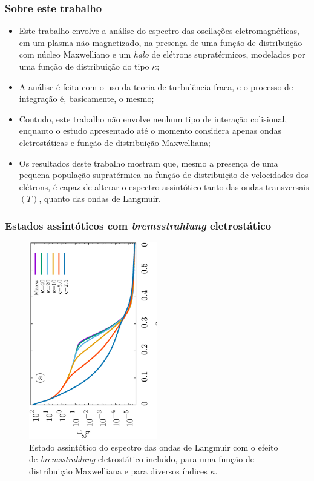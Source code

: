 \documentclass[10pt,aspectratio=1610,lualatex]{beamer}
\begin{document}
\begin{frame}
  \frametitle{Sobre este trabalho}
  \begin{itemize}
    \item Este trabalho envolve a análise do espectro das oscilações
    eletromagnéticas, em um plasma não magnetizado, na presença de uma
    função de distribuição com núcleo Maxwelliano e um \emph{halo} de
    elétrons supratérmicos, modelados por uma função de distribuição
    do tipo $\kappa$;
    \vspace{0.2cm}
    \pause
    \item A análise é feita com o uso da teoria de turbulência fraca,
    e o processo de integração é, basicamente, o mesmo;
    \vspace{0.2cm}
    \pause
    \item Contudo, este trabalho não envolve nenhum tipo de interação
      colisional, enquanto o estudo apresentado até o momento considera
      apenas ondas eletrostáticas e função de distribuição Maxwelliana;
    \vspace{0.2cm}
    \pause
    \item Os resultados deste trabalho mostram que, mesmo a presença de
    uma pequena população supratérmica na função de distribuição de
    velocidades dos elétrons, é capaz de alterar o espectro assintótico
    tanto das ondas transversais  $(T)$, quanto das ondas de Langmuir.
  \end{itemize}
\end{frame}

\begin{frame}
  \frametitle{Estados assintóticos com \emph{bremsstrahlung}
  eletrostático}
  \begin{figure}
    \centering\includegraphics[width=0.5\textwidth,angle=270]{IL1D_005kvar}
    \caption*{Estado assintótico do espectro das ondas de Langmuir com o
      efeito de \emph{bremsstrahlung} eletrostático incluído, para uma função de
      distribuição Maxwelliana e para diversos índices $\kappa$.}
  \end{figure}
\end{frame}
\end{document}
